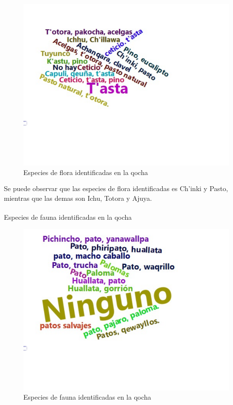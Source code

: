 \documentclass[12pt]{article}\usepackage[]{graphicx}\usepackage[]{xcolor}
\makeatletter
\def\maxwidth{ %
  \ifdim\Gin@nat@width>\linewidth
    \linewidth
  \else
    \Gin@nat@width
  \fi
}
\newenvironment{knitrout}{}{} %
\makeatother
\begin{document}
	\begin{figure}[H]
	\centering
\begin{knitrout}
\color{fgcolor}
\includegraphics[width=\maxwidth]{figure/treintayuno-1} 
\end{knitrout}
	\caption{Especies de flora identificadas en la qocha}
	\end{figure}
	Se puede observar que las especies de flora identificadas es Ch'inki y Pasto, mientras que las demas son Ichu, Totora y Ajuya.\\
	\\
	Especies de fauna identificadas en la qocha
	\begin{figure}[H]
	
	\centering
\begin{knitrout}
\color{fgcolor}
\includegraphics[width=\maxwidth]{figure/treintaydos-1} 
\end{knitrout}
	\caption{Especies de fauna identificadas en la qocha}
	\end{figure}
\end{document}
